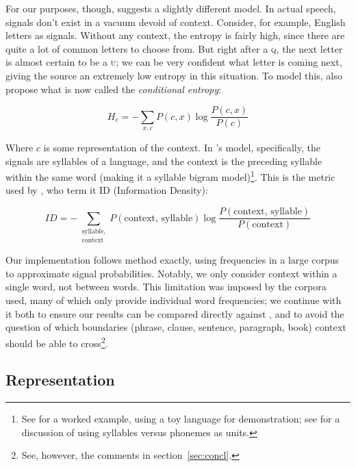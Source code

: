 \documentclass[12pt,twoside]{article}
\begin{document}
For our purposes, though, \citet{oh} suggests a slightly different model. In actual speech, signals don't exist in a vacuum devoid of context. Consider, for example, English letters as signals. Without any context, the entropy is fairly high, since there are quite a lot of common letters to choose from. But right after a \textsc{q}, the next letter is almost certain to be a \textsc{u}; we can be very confident what letter is coming next, giving the source an extremely low entropy in this situation. To model this, \citet[52]{shannon} also propose what is now called the \emph{conditional entropy}:

\begin{equation}
H_c = - \sum_{x,c} P(c,x) \log \frac{P(c,x)}{P(c)}
\end{equation}

Where \(c\) is some representation of the context. In \citeauthor{oh}'s model, specifically, the signals are syllables of a language, and the context is the preceding syllable within the same word (making it a syllable bigram model)\footnote{See \cite[41]{oh} for a worked example, using a toy language for demonstration; see \cite[545]{pellegrino} for a discussion of using syllables versus phonemes as units.}. This is the metric used by \citet{coupé}, who term it ID (Information Density):

\begin{equation}
\label{eq:id}
ID = - \sum_{\substack{\textrm{syllable},\\\textrm{context}}} P(\textrm{context, syllable}) \log \frac{P(\textrm{context, syllable})}{P(\textrm{context})}
\end{equation}

Our implementation follows  method exactly, using frequencies in a large corpus to approximate signal probabilities. Notably, we only consider context within a single word, not between words. This limitation was imposed by the corpora \citeauthor{oh} used, many of which only provide individual word frequencies; we continue with it both to ensure our results can be compared directly against , and to avoid the question of which boundaries (phrase, clause, sentence, paragraph, book) context should be able to cross\footnote{See, however, the comments in section~\ref{sec:concl}.}.

\subsection{Representation}
\label{subsec:repr}
\end{document}
